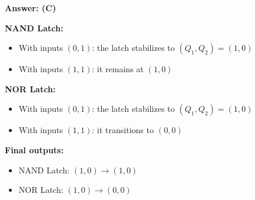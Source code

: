 \documentclass[12pt]{article}
\begin{document}
\vspace{0.5em}
{\color{!50!black}\textbf{Answer: (C)}}

\vspace{0.5em}
\textbf{NAND Latch:}
\begin{itemize}
    \item With inputs \((0,1)\): the latch stabilizes to \((Q_1, Q_2) = (1,0)\)
    \item With inputs \((1,1)\): it remains at \((1,0)\)
\end{itemize}

\textbf{NOR Latch:}
\begin{itemize}
    \item With inputs \((0,1)\): the latch stabilizes to \((Q_1, Q_2) = (1,0)\)
    \item With inputs \((1,1)\): it transitions to \((0,0)\)
\end{itemize}

\textbf{Final outputs:}
\begin{itemize}
    \item NAND Latch: \((1,0) \rightarrow (1,0)\)
    \item NOR Latch: \((1,0) \rightarrow (0,0)\)
\end{itemize}
\end{document}
